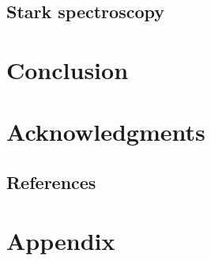 \documentclass[a4paper,10pt]{article}
\begin{document}
		\twocolumn
		
		\subsection{Stark spectroscopy}

	\section{Conclusion}
		
	\section{Acknowledgments}
		
	\subsection{References}

		
		

	\section{Appendix}
\end{document}
